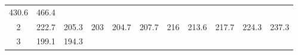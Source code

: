\documentclass[]{article}
\theoremstyle{definition}
\theoremstyle{definition}
\theoremstyle{definition}
\theoremstyle{remark}
\begin{document}
\begin{longtable}[]{@{}ccccccccccc@{}}
\begin{minipage}[t]{0.06\columnwidth}
430.6\strut
\end{minipage} & \begin{minipage}[t]{0.06\columnwidth}\centering\strut
466.4\strut
\end{minipage}\tabularnewline
\begin{minipage}[t]{0.08\columnwidth}\centering\strut
2\strut
\end{minipage} & \begin{minipage}[t]{0.06\columnwidth}\centering\strut
222.7\strut
\end{minipage} & \begin{minipage}[t]{0.06\columnwidth}\centering\strut
205.3\strut
\end{minipage} & \begin{minipage}[t]{0.06\columnwidth}\centering\strut
203\strut
\end{minipage} & \begin{minipage}[t]{0.06\columnwidth}\centering\strut
204.7\strut
\end{minipage} & \begin{minipage}[t]{0.06\columnwidth}\centering\strut
207.7\strut
\end{minipage} & \begin{minipage}[t]{0.06\columnwidth}\centering\strut
216\strut
\end{minipage} & \begin{minipage}[t]{0.06\columnwidth}\centering\strut
213.6\strut
\end{minipage} & \begin{minipage}[t]{0.06\columnwidth}\centering\strut
217.7\strut
\end{minipage} & \begin{minipage}[t]{0.06\columnwidth}\centering\strut
224.3\strut
\end{minipage} & \begin{minipage}[t]{0.06\columnwidth}\centering\strut
237.3\strut
\end{minipage}\tabularnewline
\begin{minipage}[t]{0.08\columnwidth}\centering\strut
3\strut
\end{minipage} & \begin{minipage}[t]{0.06\columnwidth}\centering\strut
199.1\strut
\end{minipage} & \begin{minipage}[t]{0.06\columnwidth}\centering\strut
194.3\strut
\end{minipage} & \begin{minipage}[t]{0.06\columnwidth}\centering\strut

\end{minipage}
\end{longtable}
\end{document}
